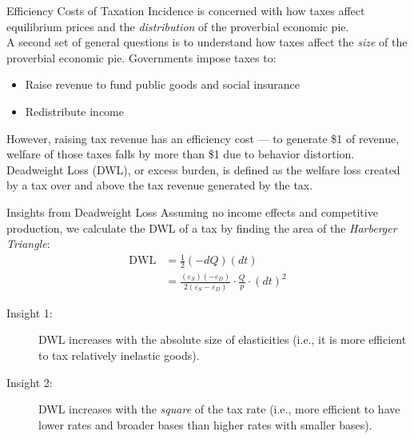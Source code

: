 \documentclass[8pt]{extarticle}
\begin{document}
  \begin{problem}{Efficiency Costs of Taxation}
    Incidence is concerned with how taxes affect equilibrium prices and the \textit{distribution} of the proverbial economic pie.\\

    A second set of general questions is to understand how taxes affect the \textit{size} of the proverbial economic pie. Governments impose taxes to:
    \begin{itemize}
      \item Raise revenue to fund public goods and social insurance
      \item Redistribute income
    \end{itemize}
    However, raising tax revenue has an efficiency cost --- to generate \$1 of revenue, welfare of those taxes falls by more than \$1 due to behavior distortion.\\

    Deadweight Loss (DWL), or excess burden, is defined as the welfare loss created by a tax over and above the tax revenue generated by the tax.
  \end{problem}
  \begin{problem}{Insights from Deadweight Loss}
    Assuming no income effects and competitive production, we calculate the DWL of a tax by finding the area of the \textit{Harberger Triangle}:
    \begin{align*}
      \text{DWL} &= \frac{1}{2}(-dQ)(dt) \tag*{recall that $dQ$ is negative}\\
                 &= \frac{(\varepsilon_S)(-\varepsilon_D)}{2(\varepsilon_S - \varepsilon_D)}\cdot \frac{Q}{p} \cdot (dt)^2
    \end{align*}
    \begin{description}
      \item[Insight 1:] DWL increases with the absolute size of elasticities (i.e., it is more efficient to tax relatively inelastic goods).
      \item[Insight 2:] DWL increases with the \textit{square} of the tax rate (i.e., more efficient to have lower rates and broader bases than higher rates with smaller bases).
    \end{description}
  \end{problem}
\end{document}
